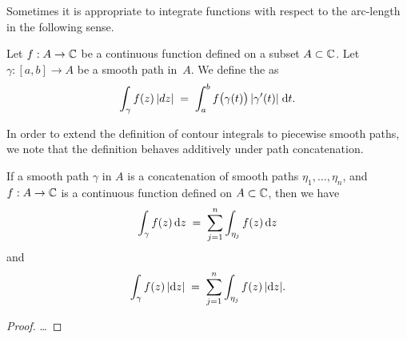 Sometimes it is appropriate to integrate functions with respect to the
arc-length in the following sense.
\begin{definition}
  \label{def:smooth_arc_length_integral}
  Let $f : A \to \mathbb{C}$ be a continuous function defined on a subset $A \subset \mathbb{C}$.
  Let $\gamma \colon [a,b] \to A$ be a smooth path in~$A$.
  We define the  as
  \begin{align*}
    \int_\gamma f(z) \, |dz|
    \; = \; \int_a^b f \big( \gamma(t) \big) \, |\gamma'(t)| \; \mathrm{d} t .
  \end{align*}
\end{definition}

In order to extend the definition of contour integrals to piecewise smooth paths,
we note that the definition behaves additively under path concatenation.

\begin{lemma}
  \label{lem:integral_concatenation}
  If a smooth path $\gamma$ in $A$ is a concatenation of smooth
  paths $\eta_1, \ldots, \eta_n$, and
  $f : A \to \mathbb{C}$ is a continuous function defined on $A \subset \mathbb{C}$,
  then we have
  \begin{align*}
    \int_\gamma f(z) \, \mathrm{d} z \; = \; \sum_{j=1}^n \int_{\eta_j} f(z) \, \mathrm{d} z
  \end{align*}
  and
  \begin{align*}
    \int_\gamma f(z) \, |\mathrm{d} z| \; = \; \sum_{j=1}^n \int_{\eta_j} f(z) \, |\mathrm{d} z| .
  \end{align*}
\end{lemma}
\begin{proof}
  \ldots
\end{proof}

